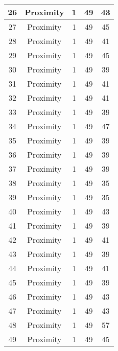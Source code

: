 \documentclass[results.tex]{subfiles}
\begin{document}
\begin{center}
\begin{tabular}{| c || c | c | c | c |}
    \hline
    26 & Proximity & 1 & 49 & 43 \\ 
    \hline
    27 & Proximity & 1 & 49 & 45 \\ 
    \hline
    28 & Proximity & 1 & 49 & 41 \\ 
    \hline
    29 & Proximity & 1 & 49 & 45 \\ 
    \hline
    30 & Proximity & 1 & 49 & 39 \\ 
    \hline
    31 & Proximity & 1 & 49 & 41 \\ 
    \hline
    32 & Proximity & 1 & 49 & 41 \\ 
    \hline
    33 & Proximity & 1 & 49 & 39 \\ 
    \hline
    34 & Proximity & 1 & 49 & 47 \\ 
    \hline
    35 & Proximity & 1 & 49 & 39 \\ 
    \hline
    36 & Proximity & 1 & 49 & 39 \\ 
    \hline
    37 & Proximity & 1 & 49 & 39 \\ 
    \hline
    38 & Proximity & 1 & 49 & 35 \\ 
    \hline
    39 & Proximity & 1 & 49 & 35 \\ 
    \hline
    40 & Proximity & 1 & 49 & 43 \\ 
    \hline
    41 & Proximity & 1 & 49 & 39 \\ 
    \hline
    42 & Proximity & 1 & 49 & 41 \\ 
    \hline
    43 & Proximity & 1 & 49 & 39 \\ 
    \hline
    44 & Proximity & 1 & 49 & 41 \\ 
    \hline
    45 & Proximity & 1 & 49 & 39 \\ 
    \hline
    46 & Proximity & 1 & 49 & 43 \\ 
    \hline
    47 & Proximity & 1 & 49 & 43 \\ 
    \hline
    48 & Proximity & 1 & 49 & 57 \\ 
    \hline
    49 & Proximity & 1 & 49 & 45 \\ 
    \hline   \end{tabular}
\end{center}
\end{document}
